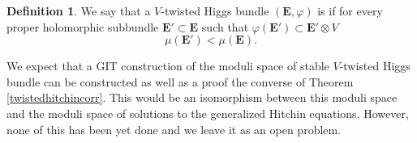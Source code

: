 \documentclass[12pt,a4paper]{book}
\theoremstyle{definition} \newtheorem{defn}[thm]{Definition}
\theoremstyle{definition} \newtheorem{ejemplo}[thm]{Example}
\theoremstyle{remark} \newtheorem{rem}[thm]{Remark}
\newcommand{\ve}[1]{\mathbf{#1}}
\let\emph\relax
\begin{document}
    \begin{defn}
      We say that a $V$-twisted Higgs bundle $(\ve{E},\varphi)$ is \emph{stable} if for every proper holomorphic subbundle $\ve{E}'\subset \ve{E}$ such that $\varphi(\ve{E}')\subset \ve{E}'\otimes V$
      \begin{equation*}
	\mu(\ve{E}')<\mu(\ve{E}).
      \end{equation*}
    \end{defn}

    We expect that a GIT construction of the moduli space of stable $V$-twisted Higgs bundle can be constructed as well as a proof the converse of Theorem \ref{twistedhitchincorr}. This would be an isomorphism between this moduli space and the moduli space of solutions to the generalized Hitchin equations. However, none of this has been yet done and we leave it as an open problem.

\nocite{*}


\end{document}
